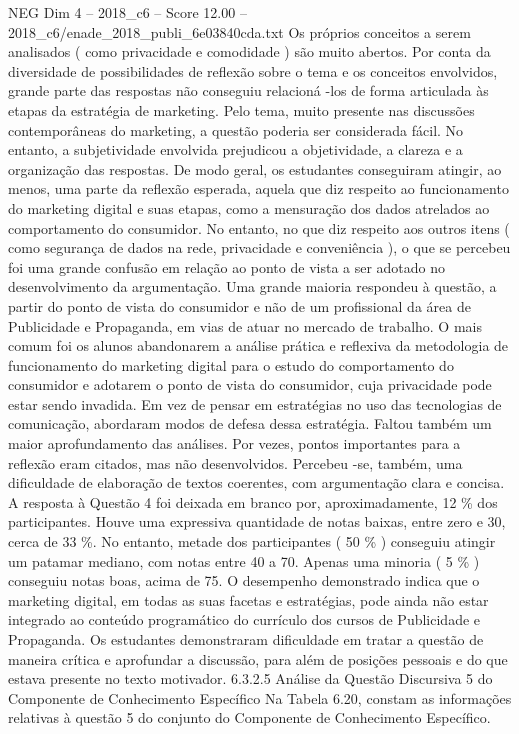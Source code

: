 \begin{textsample}{NEG Dim 4 – 2018\_c6 – Score 12.00 – 2018\_c6/enade\_2018\_publi\_6e03840cda.txt}
Os próprios conceitos a serem analisados ( como privacidade e comodidade ) são muito abertos.
Por conta da diversidade de possibilidades de reflexão sobre o tema e os conceitos envolvidos, grande parte das respostas não conseguiu relacioná -los de forma articulada às etapas da estratégia de marketing.
Pelo tema, muito presente nas discussões contemporâneas do marketing, a questão poderia ser considerada fácil.
No entanto, a subjetividade envolvida prejudicou a objetividade, a clareza e a organização das respostas.
De modo geral, os estudantes conseguiram atingir, ao menos, uma parte da reflexão esperada, aquela que diz respeito ao funcionamento do marketing digital e suas etapas, como a mensuração dos dados atrelados ao comportamento do consumidor.
No entanto, no que diz respeito aos outros itens ( como segurança de dados na rede, privacidade e conveniência ), o que se percebeu foi uma grande confusão em relação ao ponto de vista a ser adotado no desenvolvimento da argumentação.
Uma grande maioria respondeu à questão, a partir do ponto de vista do consumidor e não de um profissional da área de Publicidade e Propaganda, em vias de atuar no mercado de trabalho.
O mais comum foi os alunos abandonarem a análise prática e reflexiva da metodologia de funcionamento do marketing digital para o estudo do comportamento do consumidor e adotarem o ponto de vista do consumidor, cuja privacidade pode estar sendo invadida.
Em vez de pensar em estratégias no uso das tecnologias de comunicação, abordaram modos de defesa dessa estratégia.
Faltou também um maior aprofundamento das análises.
Por vezes, pontos importantes para a reflexão eram citados, mas não desenvolvidos.
Percebeu -se, também, uma dificuldade de elaboração de textos coerentes, com argumentação clara e concisa.
A resposta à Questão 4 foi deixada em branco por, aproximadamente, 12 \% dos participantes.
Houve uma expressiva quantidade de notas baixas, entre zero e 30, cerca de 33 \%.
No entanto, metade dos participantes ( 50 \% ) conseguiu atingir um patamar mediano, com notas entre 40 a 70.
Apenas uma minoria ( 5 \% ) conseguiu notas boas, acima de 75.
O desempenho demonstrado indica que o marketing digital, em todas as suas facetas e estratégias, pode ainda não estar integrado ao conteúdo programático do currículo dos cursos de Publicidade e Propaganda.
Os estudantes demonstraram dificuldade em tratar a questão de maneira crítica e aprofundar a discussão, para além de posições pessoais e do que estava presente no texto motivador. 6.3.2.5 Análise da Questão Discursiva 5 do Componente de Conhecimento Específico Na Tabela 6.20, constam as informações relativas à questão 5 do conjunto do Componente de Conhecimento Específico.

\end{textsample}
